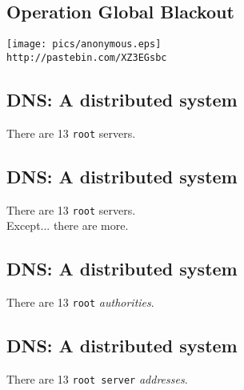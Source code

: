\documentclass[xga]{xdvislides}
\begin{document}
\subsection{Operation Global Blackout}
\vspace*{\fill}
\begin{center}
	\texttt{[image: pics/anonymous.eps]} \\
	\addvspace{.2in}
	\verb+http://pastebin.com/XZ3EGsbc+ \\
	\addvspace{.1in}
\end{center}
\vspace*{\fill}

\subsection{DNS: A distributed system}
\vspace{.5in}
\begin{center}
	\Huge
	There are 13 \verb+root+ servers. \\
\end{center}
\Normalsize

\subsection{DNS: A distributed system}
\vspace{.5in}
\begin{center}
	\Huge
	There are 13 \verb+root+ servers. \\
	\vspace{.5in}
	Except... there are more.
\end{center}
\Normalsize

\subsection{DNS: A distributed system}
\vspace{.5in}
\begin{center}
	\Huge
	There are 13 \verb+root+ {\em authorities}. \\
\end{center}
\Normalsize

\subsection{DNS: A distributed system}
\vspace{.5in}
\begin{center}
	\Huge
	There are 13 \verb+root server+ {\em addresses}. \\
\end{center}
\Normalsize
\end{document}

